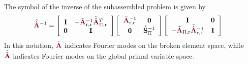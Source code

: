 \begin{definition}
The symbol of the inverse of the subassembled problem is given by
\begin{equation}
\tilde{\hat{\color{burgundy} \mathbf{A}}}\color{black}^{-1} =
\left[ \begin{array}{c c}
\mathbf{I}  &  -\tilde{\color{burgundy}\mathbf{A}}_{\text{r}, \text{r}}^{-1} \tilde{\hat{\color{burgundy}\mathbf{A}}}\color{black}_{\Pi, \text{r}}^T  \\
\mathbf{0}  &  \mathbf{I}                                                                                                                             \\
\end{array} \right]
\left[ \begin{array}{c c}
\tilde{\color{burgundy}\mathbf{A}}_{\text{r}, \text{r}}^{-1}  &  \mathbf{0}                                        \\
\mathbf{0}                                                    &  \tilde{\hat{\mathbf{S}}}\color{black}_{\Pi}^{-1}  \\
\end{array} \right]
\left[ \begin{array}{c c}
\mathbf{I}                                                                                                                           &  \mathbf{0}  \\
-\tilde{\color{burgundy}\mathbf{A}}_{\Pi, \text{r}} \tilde{\hat{\color{burgundy}\mathbf{A}}}\color{black}_{\text{r}, \text{r}}^{-1}  &  \mathbf{I}  \\
\end{array} \right]
\end{equation}
In this notation, $\tilde{\color{burgundy}\mathbf{A}}$ indicates Fourier modes on the broken element space, while $\tilde{\hat{\color{burgundy}\mathbf{A}}}$ indicates Fourier modes on the global primal variable space.


\end{definition}
